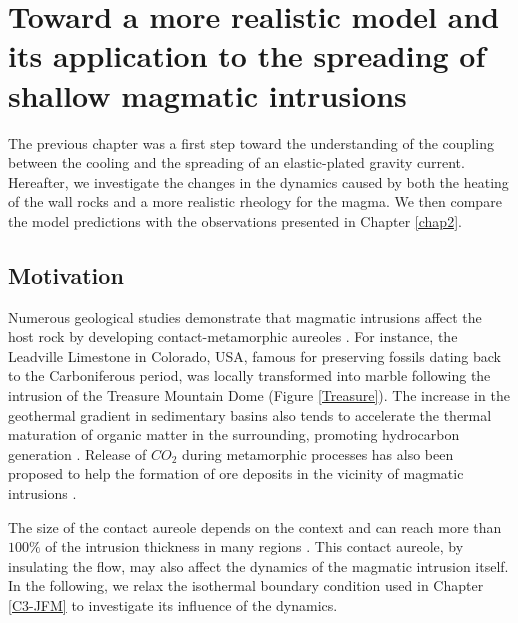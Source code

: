 
\chapter{Toward  a more  realistic model  and its  application to  the
  spreading of shallow magmatic intrusions}
\label{Heating}

\minitoc

The previous chapter was a first  step toward the understanding of the
coupling between  the cooling and  the spreading of  an elastic-plated
gravity  current.   Hereafter,  we  investigate  the  changes  in  the
dynamics  caused by  both the  heating of  the wall  rocks and  a more
realistic  rheology  for  the  magma.    We  then  compare  the  model
predictions with the observations presented in Chapter \ref{chap2}.


\section{Motivation}
\label{sec:introduction}

Numerous  geological  studies  demonstrate  that  magmatic  intrusions
affect  the  host  rock  by  developing  contact-metamorphic  aureoles
\citep{Jaeger:1959du,Galushkin:1997dy,Senger:2014tt}.   For  instance,
the  Leadville  Limestone  in  Colorado, USA,  famous  for  preserving
fossils  dating   back  to  the  Carboniferous   period,  was  locally
transformed  into  marble  following  the intrusion  of  the  Treasure
Mountain Dome (Figure \ref{Treasure}).  The increase in the geothermal
gradient in  sedimentary basins also  tends to accelerate  the thermal
maturation of organic matter in the surrounding, promoting hydrocarbon
generation   \citep{Senger:2014tt}.    Release    of   $CO_2$   during
metamorphic processes has also been  proposed to help the formation of
ore    deposits   in    the    vicinity    of   magmatic    intrusions
\citep{SILLITOE:1998bs,Ganino:2008ft,Zhou:2008hc}.

The size of  the contact aureole depends on the  context and can reach
more  than  $100\%$  of  the   intrusion  thickness  in  many  regions
\citep{Galushkin:1997dy}.   This contact  aureole,  by insulating  the
flow, may also  affect the dynamics of the  magmatic intrusion itself.
In the following,  we relax the isothermal boundary  condition used in
Chapter \ref{C3-JFM} to investigate its influence of the dynamics.

